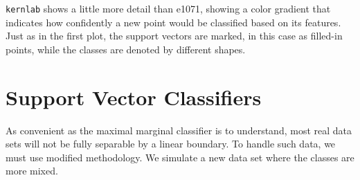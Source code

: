 \documentclass[]{book}
\newenvironment{Shaded}{\begin{snugshade}}{\end{snugshade}}
\newcommand{\CommentTok}[1]{\textcolor[rgb]{0.56,0.35,0.01}{\textit{#1}}}
\newcommand{\DataTypeTok}[1]{\textcolor[rgb]{0.13,0.29,0.53}{#1}}
\newcommand{\DecValTok}[1]{\textcolor[rgb]{0.00,0.00,0.81}{#1}}
\newcommand{\FloatTok}[1]{\textcolor[rgb]{0.00,0.00,0.81}{#1}}
\newcommand{\KeywordTok}[1]{\textcolor[rgb]{0.13,0.29,0.53}{\textbf{#1}}}
\newcommand{\NormalTok}[1]{#1}
\newcommand{\OperatorTok}[1]{\textcolor[rgb]{0.81,0.36,0.00}{\textbf{#1}}}
\newcommand{\StringTok}[1]{\textcolor[rgb]{0.31,0.60,0.02}{#1}}
\begin{document}
\texttt{kernlab} shows a little more detail than e1071, showing a color gradient that indicates how confidently a new point would be classified based on its features. Just as in the first plot, the support vectors are marked, in this case as filled-in points, while the classes are denoted by different shapes.

\hypertarget{support-vector-classifiers}{%
\section{Support Vector Classifiers}\label{support-vector-classifiers}}

As convenient as the maximal marginal classifier is to understand, most real data sets will not be fully separable by a linear boundary. To handle such data, we must use modified methodology. We simulate a new data set where the classes are more mixed.

\begin{Shaded}
\end{Shaded}
\end{document}
